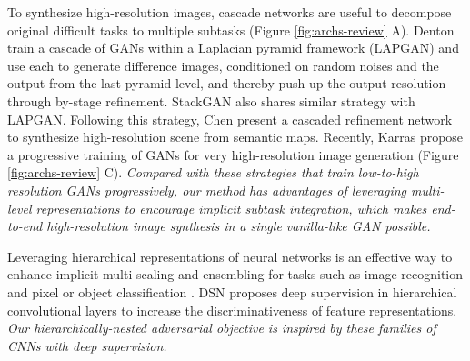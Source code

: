 \documentclass[10pt,twocolumn,letterpaper]{article}
\begin{document}
To synthesize high-resolution images, cascade networks are useful to decompose original difficult tasks to multiple subtasks (Figure \ref{fig:archs-review} A).
Denton \etal \cite{denton2015deep} train a cascade of GANs within a Laplacian pyramid framework (LAPGAN) and use each to generate difference images, conditioned on random noises and the output from the last pyramid level, and thereby push up the output resolution through by-stage refinement. StackGAN also shares similar strategy with LAPGAN. Following this strategy, Chen \etal \cite{chen2017photographic} present a cascaded refinement network to synthesize high-resolution scene from semantic maps. 
Recently, Karras \etal \cite{Karras2017progressive} propose a progressive training of GANs for very high-resolution image generation (Figure \ref{fig:archs-review} C). \textit{Compared with these strategies that train low-to-high resolution GANs progressively, our method has advantages of leveraging multi-level representations to encourage implicit subtask integration, which makes end-to-end high-resolution image synthesis in a single vanilla-like GAN possible.}


Leveraging hierarchical representations of neural networks is an effective way to enhance implicit multi-scaling and ensembling for tasks such as image recognition \cite{lee2015deeply} and pixel or object classification \cite{xie2015holistically,cai2016unified,long2015fully}. DSN \cite{lee2015deeply} proposes deep supervision in hierarchical convolutional layers to increase the discriminativeness of feature representations. 
\textit{Our hierarchically-nested adversarial objective is inspired by these families of CNNs with deep supervision. }

%
%
\end{document}
